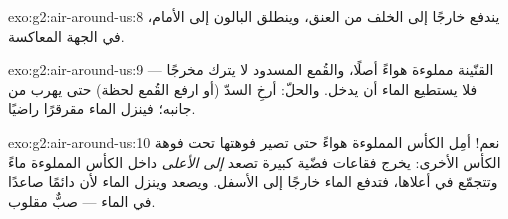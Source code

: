 \begin{solution}{exo:g2:air-around-us:8}
يندفع  خارجًا إلى الخلف من العنق، وينطلق البالون إلى
الأمام، في الجهة المعاكسة.
\end{solution}

\begin{solution}{exo:g2:air-around-us:9}
القنّينة مملوءة هواءً أصلًا، والقُمع المسدود لا يترك 
مخرجًا --- فلا يستطيع الماء أن يدخل. والحلّ: أرخِ السدّ (أو
ارفع القُمع لحظة) حتى يهرب  من جانبه؛ فينزل الماء مقرقرًا
راضيًا.
\end{solution}

\begin{solution}{exo:g2:air-around-us:10}
نعم! أمِل الكأس المملوءة هواءً حتى تصير فوهتها تحت فوهة الكأس
الأخرى: يخرج  فقاعات فضّية كبيرة تصعد \emph{إلى الأعلى}
داخل الكأس المملوءة ماءً وتتجمّع في أعلاها، فتدفع الماء خارجًا
إلى الأسفل. ويصعد  وينزل الماء لأن   دائمًا
صاعدًا في الماء --- صبٌّ مقلوب.
\end{solution}
